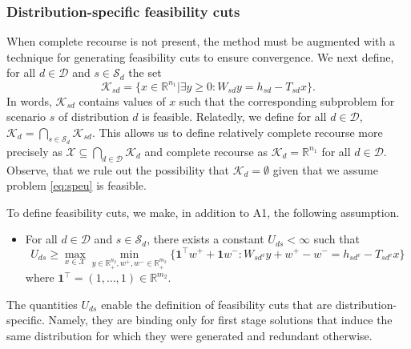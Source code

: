 \documentclass[12pt]{article}
\theoremstyle{thmstylethree}%
\newcommand{\mtc}[1] {\mathcal{#1}}
\def\R{\ensuremath{\mathbb{R}}}
\begin{document}
\subsubsection{Distribution-specific feasibility cuts}
\label{subsubsec:cont_sp:feas_cut}
When complete recourse is not present, the method must be augmented with a technique for generating feasibility cuts to ensure convergence. We next define, for all $d\in\mtc{D}$ and $s\in\mtc{S}_d$ the set 
$$\mtc{K}_{sd}=\big\{x\in\R^{n_1}|\exists y\geq 0: W_{sd}y=h_{sd}-T_{sd}x \big\}.$$
In words, $\mtc{K}_{sd}$ contains values of $x$ such that the corresponding subproblem for scenario $s$ of distribution $d$ is feasible. Relatedly, we define for all $d\in\mtc{D}$, $\mtc{K}_{d}=\bigcap_{s\in\mtc{S}_d}\mtc{K}_{sd}$.
This allows us to define relatively complete recourse more precisely as $\mtc{X}\subseteq \bigcap_{d\in\mtc{D}}\mtc{K}_d$ and complete recourse as $\mtc{K}_d=\R^{n_1}$ for all $d\in\mtc{D}$.
Observe, that we rule out the possibility that $\mtc{K}_d=\emptyset$ given that we assume problem \eqref{eq:speu} is feasible.

To define feasibility cuts, we make, in addition to A1, the following assumption.
\begin{itemize}
    \item[\textbf{A2}] For all $d\in\mtc{D}$ and $s\in\mtc{S}_d$, there exists a constant $U_{ds}<\infty$ such that
    $$U_{ds}\geq \max_{x\in\mtc{X}}\min_{y\in\R^{n_2}_+,w^+,w^-\in\R^{m_2}_+}\{\mathbf{1}^\top w^++\mathbf{1}w^-:W_{sd^v}y+w^+-w^-=h_{sd^v}-T_{sd^v}x\}$$
    where $\mathbf{1}^\top=(1,\ldots,1)\in\R^{m_2}$.
\end{itemize}
The quantities $U_{ds}$ enable the definition of feasibility cuts that are distribution-specific. Namely, they are binding only for first stage solutions that induce the same distribution for which they were generated and redundant otherwise.
\end{document}
